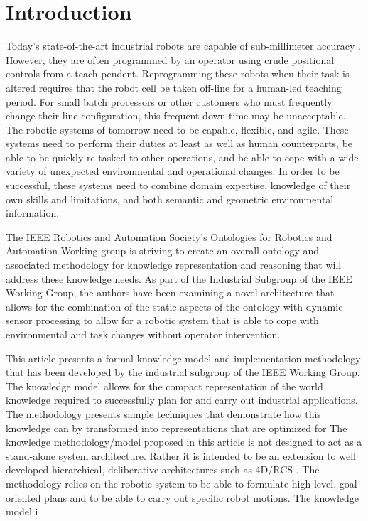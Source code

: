 \documentclass[preprint,12pt]{elsarticle}
\begin{document}

\section{Introduction}
\label{sect:introduction}
Today's state-of-the-art industrial robots are capable of sub-millimeter accuracy \cite{RobotAccuracy}.
However, they are often programmed by an operator using crude positional controls from a teach pendent. 
Reprogramming these robots when their task is altered requires that the robot cell be taken off-line for a
human-led teaching period.  For small batch processors or other customers who must frequently change
their line configuration, this frequent down time may be unacceptable. 
The robotic systems of tomorrow
need to be capable, flexible, and agile.  These systems need to perform their duties at least 
as well as human counterparts, be able to be quickly re-tasked to other operations,
and be able to cope with a wide variety of unexpected environmental and operational changes. 
In order to be successful, these systems need to combine domain expertise,
knowledge of their own skills and limitations, and both semantic and geometric environmental information.

The IEEE Robotics and Automation Society's Ontologies for Robotics and Automation Working group is 
striving to create an overall ontology and
associated methodology for knowledge representation and reasoning that will address these 
knowledge needs. As part of the
Industrial Subgroup of the IEEE Working Group, the authors have been examining a novel 
architecture that allows for the combination of the static
aspects of the ontology with dynamic sensor processing to allow for a robotic system that 
is able to cope with environmental and task changes
without operator intervention.

This article presents a formal knowledge model and implementation methodology
that has been developed by the industrial subgroup
of the IEEE Working Group. The knowledge model allows for the compact representation
of the world knowledge required to successfully plan for and carry out industrial applications.
The methodology presents sample techniques that demonstrate how this knowledge can by transformed
into representations that are optimized for 
The knowledge methodology/model proposed in this article is not designed to act as a stand-alone
system architecture. Rather it is intended to be an extension to well developed hierarchical, 
deliberative architectures such as 4D/RCS \cite{Albus2000}. The methodology relies on the robotic system
to be able to formulate high-level, goal oriented plans and to be able to carry out
specific robot motions. The knowledge model i
\end{document}
